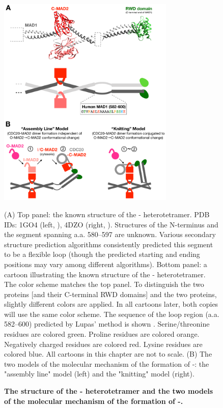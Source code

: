 \begin{figure}
    \centering
    \includegraphics[width=0.75\textwidth]{chapters/figures/MAD1C+KnittingModel.pdf}
    \caption{\textbf{The structure of the - heterotetramer and the two models of the molecular mechanism of the formation of -.}}
    \noindent\justifying (A) Top panel: the known structure of the - heterotetramer. PDB IDs: 1GO4 (left, \cite{Structure1GO4}), 4DZO (right, \cite{Structure4DZO}). Structures of the N-terminus and the segment spanning a.a. 580--597 are unknown. Various secondary structure prediction algorithms consistently predicted this segment to be a flexible loop (though the predicted starting and ending positions may vary among different algorithms). Bottom panel: a cartoon illustrating the known structure of the - heterotetramer. The color scheme matches the top panel. To distinguish the two  proteins [and their C-terminal RWD domains] and the two  proteins, slightly different colors are applied. In all cartoons later, both copies will use the same color scheme. The sequence of the loop region (a.a. 582--600) predicted by Lupas' method is shown \cite{LupasCOILS}. Serine/threonine residues are colored green. Proline residues are colored orange. Negatively charged residues are colored red. Lysine residues are colored blue. All cartoons in this chapter are not to scale. (B) The two models of the molecular mechanism of the formation of -: the "assembly line" model (left) and the "knitting" model (right).
    \label{MAD1C+KnittingModel}
\end{figure}

